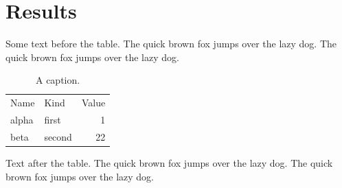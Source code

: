 \documentclass{article}
\begin{document}
\section{Results}
Some text before the table. The quick brown fox jumps over the lazy dog.
The quick brown fox jumps over the lazy dog.

\begin{table}[ht]
\caption{A caption.}
\centering
\begin{tabular}{llr}
Name & Kind & Value \\
alpha & first & 1 \\
beta & second & 22 \\
\end{tabular}
\end{table}

Text after the table. The quick brown fox jumps over the lazy dog. The
quick brown fox jumps over the lazy dog.
\end{document}
